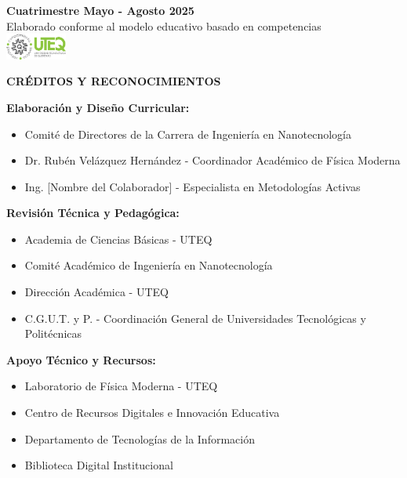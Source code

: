 \documentclass[12pt,a4paper]{book}
\begin{document}
\begin{titlepage}
\begin{center}
			\vfill
			
			{\normalsize \textcolor{uteqgray}{\textbf{Cuatrimestre Mayo - Agosto 2025}}}\\[0.5cm]
			{\small \textcolor{uteqgray}{Elaborado conforme al modelo educativo basado en competencias}}\\[1cm]
			
			\includegraphics[width=2cm]{../../Imagenes/Logo_uteq}
			
		\end{center}
	\end{titlepage}
	
	\thispagestyle{empty}
	\vspace*{1cm}
	
	\begin{center}
		\textbf{\Large CRÉDITOS Y RECONOCIMIENTOS}
	\end{center}
	
	\vspace{1cm}
	
	\textbf{Elaboración y Diseño Curricular:}
	\begin{itemize}[leftmargin=2cm]
		\item Comité de Directores de la Carrera de Ingeniería en Nanotecnología
		\item Dr. Rubén Velázquez Hernández - Coordinador Académico de Física Moderna
		\item Ing. [Nombre del Colaborador] - Especialista en Metodologías Activas
	\end{itemize}
	
	\textbf{Revisión Técnica y Pedagógica:}
	\begin{itemize}[leftmargin=2cm]
		\item Academia de Ciencias Básicas - UTEQ
		\item Comité Académico de Ingeniería en Nanotecnología
		\item Dirección Académica - UTEQ
		\item C.G.U.T. y P. - Coordinación General de Universidades Tecnológicas y Politécnicas
	\end{itemize}
	
	\textbf{Apoyo Técnico y Recursos:}
	\begin{itemize}[leftmargin=2cm]
		\item Laboratorio de Física Moderna - UTEQ
		\item Centro de Recursos Digitales e Innovación Educativa
		\item Departamento de Tecnologías de la Información
		\item Biblioteca Digital Institucional
	\end{itemize}
	
\end{document}
